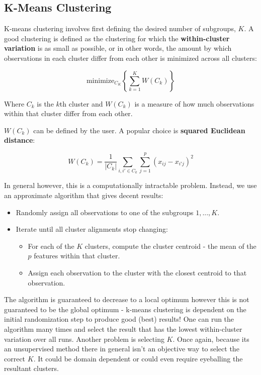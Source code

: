 \subsection{K-Means Clustering}

K-means clustering involves first defining the desired number of subgroups, $K$. A good clustering is defined as the clustering for which the \textbf{within-cluster variation} is as small as possible, or in other words, the amount by which observations in each cluster differ from each other is minimized across all clusters:

$$ \text{minimize}_{C_{K}} \left\{ \sum_{k=1}^{K}W(C_{k}) \right\} $$

Where $C_{k}$ is the $k$th cluster and $W(C_{k})$ is a measure of how much observations within that cluster differ from each other.

$W(C_{k})$ can be defined by the user. A popular choice is \textbf{squared Euclidean distance}:

$$ W(C_{k}) = \frac{1}{|C_{k}|}\sum_{i,i'\in C_{k}}\sum_{j=1}^{p}(x_{ij}-x_{i'j})^{2} $$

In general however, this is a computationally intractable problem. Instead, we use an approximate algorithm that gives decent results:

\begin{itemize}
    \item Randomly assign all observations to one of the subgroups $1,...,K$.
    \item Iterate until all cluster alignments stop changing:
    \begin{itemize}
        \item For each of the $K$ clusters, compute the cluster centroid - the mean of the $p$ features within that cluster.
        \item Assign each observation to the cluster with the closest centroid to that observation.
    \end{itemize}
\end{itemize}

The algorithm is guaranteed to decrease to a local optimum however this is not guaranteed to be the global optimum - k-means clustering is dependent on the initial randomization step to produce good (best) results! One can run the algorithm many times and select the result that has the lowest within-cluster variation over all runs. Another problem is selecting $K$. Once again, because its an unsupervised method there in general isn't an objective way to select the correct $K$. It could be domain dependent or could even require eyeballing the resultant clusters.
